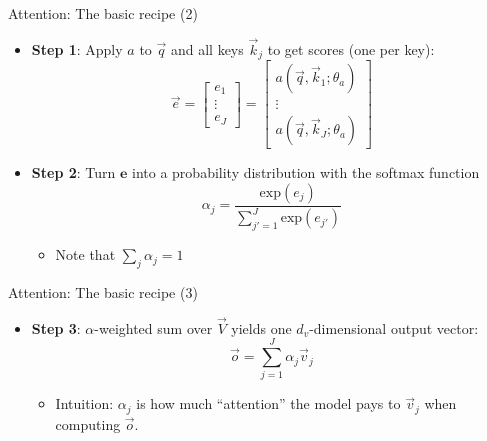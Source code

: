 
\begin{vbframe}{Attention: The basic recipe (2)}

\vfill

\begin{itemize}
	\item \textbf{Step 1}: Apply $a$ to $\vec q$ and all keys $\vec k_j$ to get scores (one per key): 
	$$\vec e = \begin{bmatrix} e_1 \\ \vdots \\ e_J \end{bmatrix} =  \begin{bmatrix} a(\vec q, \vec k_1; \theta_a) \\ \vdots \\ a(\vec q, \vec k_J; \theta_a) \end{bmatrix}$$
	\item \textbf{Step 2}: Turn $\mathbf{e}$ into a probability distribution with the softmax function
	$$\alpha_j = \frac{\mathrm{exp}(e_j)}{\sum_{j'=1}^J \mathrm{exp}(e_{j'})}$$
		\begin{itemize}
			\item Note that $\sum_j \alpha_j = 1$
		\end{itemize}
\end{itemize}

\vfill

\end{vbframe}


\begin{vbframe}{Attention: The basic recipe (3)}

\vfill

\begin{itemize}
	\item \textbf{Step 3}: $\alpha$-weighted sum over $\vec {V}$ yields one $d_v$-dimensional output vector:
	$$\vec {o} = \sum_{j=1}^J \alpha_j \vec {v}_j$$
		\begin{itemize}
			\item Intuition: $\alpha_j$ is how much ``attention'' the model pays to $\vec v_j$ when computing $\vec o$.
		\end{itemize}
\end{itemize}

\vfill

\end{vbframe}

